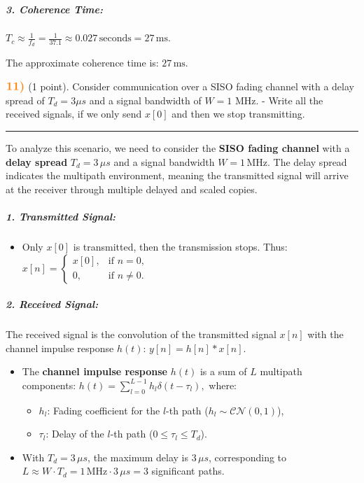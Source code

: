 \documentclass[11pt]{article}
\providecommand{\tightlist}{%
      \setlength{\itemsep}{0pt}\setlength{\parskip}{0pt}}
\begin{document}
\subparagraph{\texorpdfstring{\textbf{3. Coherence
Time}:}{3. Coherence Time:}}\label{coherence-time}

\(T_c \approx \frac{1}{f_d} = \frac{1}{37.1} \approx 0.027 \, \text{seconds} = 27 \, \text{ms}.\)

The approximate coherence time is: \(\boxed{27 \, \text{ms}}.\)

    \(\color{orange} \large \textbf{11)}\) (1 point). Consider communication
over a SISO fading channel with a delay spread of \(T_d = 3 \mu s\) and
a signal bandwidth of \(W = 1\) MHz. - Write all the received signals,
if we only send \(x[0]\) and then we stop transmitting.

    \begin{center}\rule{0.5\linewidth}{0.5pt}\end{center}

To analyze this scenario, we need to consider the \textbf{SISO fading
channel} with a \textbf{delay spread} \(T_d = 3 \, \mu s\) and a signal
bandwidth \(W = 1 \, \text{MHz}\). The delay spread indicates the
multipath environment, meaning the transmitted signal will arrive at the
receiver through multiple delayed and scaled copies.

\subparagraph{\texorpdfstring{\textbf{1. Transmitted
Signal}:}{1. Transmitted Signal:}}\label{transmitted-signal}

\begin{itemize}
\tightlist
\item
  Only \(x[0]\) is transmitted, then the transmission stops. Thus:
  \(x[n] = \begin{cases} x[0], & \text{if } n = 0, \\ 0, & \text{if } n \neq 0. \end{cases}\)
\end{itemize}

\subparagraph{\texorpdfstring{\textbf{2. Received
Signal}:}{2. Received Signal:}}\label{received-signal}

The received signal is the convolution of the transmitted signal
\(x[n]\) with the channel impulse response \(h(t)\):
\(y[n] = h[n] \ast x[n].\)

\begin{itemize}
\tightlist
\item
  The \textbf{channel impulse response} \(h(t)\) is a sum of \(L\)
  multipath components:
  \(h(t) = \sum_{l=0}^{L-1} h_l \delta(t - \tau_l),\) where:

  \begin{itemize}
  \tightlist
  \item
    \(h_l\): Fading coefficient for the \(l\)-th path
    (\(h_l \sim \mathcal{CN}(0, 1)\)),
  \item
    \(\tau_l\): Delay of the \(l\)-th path (\(0 \leq \tau_l \leq T_d\)).
  \end{itemize}
\item
  With \(T_d = 3 \, \mu s\), the maximum delay is \(3 \, \mu s\),
  corresponding to
  \(L \approx W \cdot T_d = 1 \, \text{MHz} \cdot 3 \, \mu s = \boxed{ 3 }\)
  significant paths.
\end{itemize}
\end{document}
